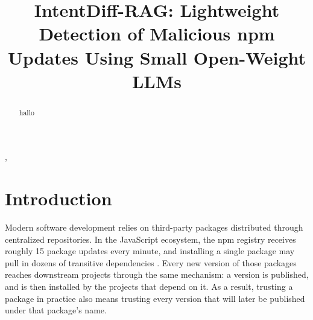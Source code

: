 \documentclass[a4paper,fleqn]{cas-dc}
\begin{document}
\let\WriteBookmarks\relax
\def\floatpagepagefraction{1}
\def\textpagefraction{.001}

\shorttitle{}
\shortauthors{}

\title[mode=title]{IntentDiff-RAG: Lightweight Detection of Malicious npm Updates Using Small Open-Weight LLMs}

\author[1]{}
\cormark[1]
\ead{}
\credit{}



\begin{abstract}
hallo
\end{abstract}

\begin{highlights}
\item
\item
\item
\end{highlights}

\begin{keywords}
\sep
\end{keywords}

\maketitle


\section{Introduction}\label{sec:intro}


Modern software development relies on third-party packages distributed through centralized repositories. In the JavaScript ecosystem, the npm registry receives roughly 15 package updates every minute, and installing a single package may pull in dozens of transitive dependencies \citep{wyss2025evaluating}. Every new version of those packages reaches downstream projects through the same mechanism: a version is published, and is then installed by the projects that depend on it. As a result, trusting a package in practice also means trusting every version that will later be published under that package's name.
\end{document}

